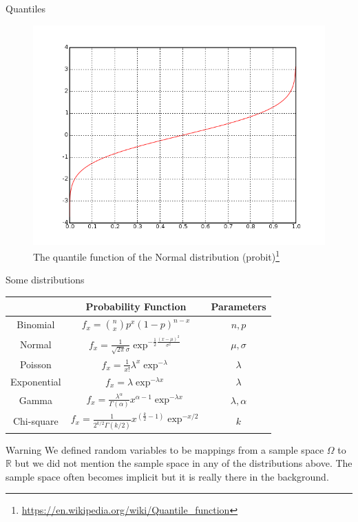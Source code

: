 \documentclass[handout]{beamer}
\begin{document}
\begin{frame}{Quantiles}
\scriptsize{
\begin{figure}[h!]
	\centering
	\includegraphics[scale=.35]{pics/Probit_plot.png}
	\caption{The quantile function of the Normal distribution (probit)\footnote{ \url{https://en.wikipedia.org/wiki/Quantile_function}}}
\end{figure}
}

\end{frame}


\begin{frame}{Some distributions}
\scriptsize{ 

\begin{table}
\centering
\begin{tabular}{c|c|c}
\hline
  & Probability Function & Parameters   \\ 
\hline
Binomial & $f_x= {n \choose x}p^{x}(1-p)^{n-x} $ & $n,p$ \\ \hline
Normal & $f_x=\frac{1}{\sqrt{2\pi}\sigma}\exp^{-\frac{1}{2}\frac{(x-\mu)^2}{\sigma^{2}}}$ & $\mu, \sigma$ \\ \hline
Poisson & $f_x=\frac{1}{x!}\lambda^{x}\exp^{-\lambda}$ & $\lambda$ \\ \hline
Exponential & $f_x= \lambda \exp^{-\lambda x}$  & $\lambda$ \\ \hline
Gamma & $f_x= \frac{\lambda^{\alpha}}{\Gamma(\alpha)} x^{\alpha -1}\exp^{-\lambda x} $ & $\lambda , \alpha$ \\ \hline
Chi-square & $f_x=\frac{1}{2^{k/2} \Gamma(k/2)} x^{(\frac{k}{2} -1)} \exp^{-x/2} $  & $k$  \\
\hline
\end{tabular}
\end{table}

\begin{block}{Warning}
We defined random variables to be mappings from a sample space $\Omega$ to $\mathbb{R}$ but we did not mention the sample space in any of the distributions above. The sample space often becomes implicit but it is really there in the background. 
\end{block}



}
\end{frame}
\end{document}
